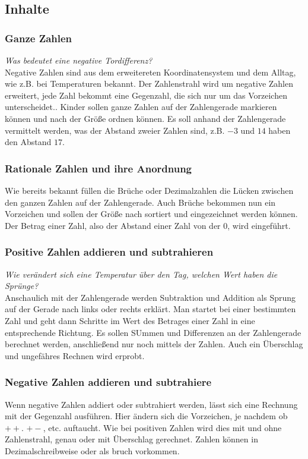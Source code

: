 \documentclass{article}
\begin{document}
\subsection{Inhalte}

\subsubsection*{Ganze Zahlen}
\textit{Was bedeutet eine negative Tordifferenz?} \\
Negative Zahlen sind aus dem erweitereten Koordinatensystem und dem Alltag, wie z.B. bei Temperaturen bekannt. Der Zahlenstrahl wird um negative Zahlen erweitert, jede Zahl bekommt eine Gegenzahl, die sich nur um das Vorzeichen unterscheidet..
Kinder sollen ganze Zahlen auf der Zahlengerade markieren können und nach der Größe ordnen können.
Es soll anhand der Zahlengerade vermittelt werden, was der Abstand zweier Zahlen sind, z.B. $-3$ und $14$ haben den Abstand $17$.


\subsubsection*{Rationale Zahlen und ihre Anordnung}
Wie bereits bekannt füllen die Brüche oder Dezimalzahlen die Lücken zwischen den ganzen Zahlen auf der Zahlengerade.
Auch Brüche bekommen nun ein Vorzeichen und sollen der Größe nach sortiert und eingezeichnet werden können.
Der Betrag einer Zahl, also der Abstand einer Zahl von der 0, wird eingeführt.
\subsubsection*{Positive Zahlen addieren und subtrahieren}
\textit{Wie verändert sich eine Temperatur über den Tag, welchen Wert haben die Sprünge?}\\
Anschaulich mit der Zahlengerade werden Subtraktion und Addition als Sprung auf der Gerade nach links oder rechts erklärt. Man startet bei einer bestimmten Zahl und geht dann Schritte im Wert des Betrages einer Zahl in eine entsprechende Richtung.
Es sollen SUmmen und Differenzen an der Zahlengerade berechnet werden, anschließend nur noch mittels der Zahlen. Auch ein Überschlag und ungefähres Rechnen wird erprobt.
\subsubsection*{Negative Zahlen addieren und subtrahiere}
Wenn negative Zahlen addiert oder subtrahiert werden, lässt sich eine Rechnung mit der Gegenzahl ausführen. Hier ändern sich die Vorzeichen, je nachdem  ob $++$. $+-$, etc. auftaucht.
Wie bei positiven Zahlen wird dies mit und ohne Zahlenstrahl, genau oder mit Überschlag gerechnet.
Zahlen können in Dezimalschreibweise oder als bruch vorkommen.
\end{document}
